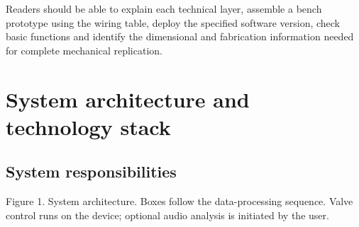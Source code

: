 \documentclass[10pt,a4paper]{article}
\begin{document}
Readers should be able to explain each technical layer, assemble a bench prototype using the wiring table, deploy the specified software version, check basic functions and identify the dimensional and fabrication information needed for complete mechanical replication.



\section{System architecture and technology stack}

\subsection{System responsibilities}

\begin{center}
\end{center}

Figure 1. System architecture. Boxes follow the data-processing sequence. Valve control runs on the device; optional audio analysis is initiated by the user.
\end{document}
